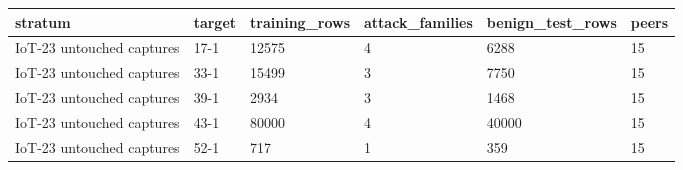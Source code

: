 \begin{tabular}{llllll}
\toprule
stratum & target & training\_rows & attack\_families & benign\_test\_rows & peers \\
\midrule
IoT-23 untouched captures & 17-1 & 12575 & 4 & 6288 & 15 \\
IoT-23 untouched captures & 33-1 & 15499 & 3 & 7750 & 15 \\
IoT-23 untouched captures & 39-1 & 2934 & 3 & 1468 & 15 \\
IoT-23 untouched captures & 43-1 & 80000 & 4 & 40000 & 15 \\
IoT-23 untouched captures & 52-1 & 717 & 1 & 359 & 15 \\
\bottomrule
\end{tabular}
